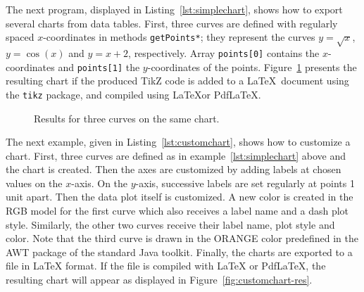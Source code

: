 \begin{latexonly}




The next program, displayed in Listing~\ref{lst:simplechart},
shows how to export several charts from data tables.
First, three curves are defined with regularly spaced $x$-coordinates
in methods \texttt{getPoints*}; they represent the curves $y = \sqrt x$,
$y = \cos(x)$ and $y = x+2$, respectively. Array \texttt{points[0]} contains
the $x$-coordinates and \texttt{points[1]} the $y$-coordinates
of the points.
Figure~\ref{fig:simplechart-res} presents the resulting chart if the produced
TikZ code is added to a \LaTeX\ document using the \texttt{tikz}
package, and compiled using \LaTeX  or PdfLaTeX.





\begin{figure}

\caption{Results for three curves on the same chart.\label{fig:simplechart-res}}
\end{figure}




The next example, given in Listing~\ref{lst:customchart},
 shows how to customize a chart. First, three curves are defined as
in example~\ref{lst:simplechart} above and the chart is created. Then the
axes are customized by adding labels at chosen values on the $x$-axis.
On the $y$-axis, successive labels are set regularly at points 1 unit apart.
Then the data plot itself is customized. A new color is created in the RGB
model for the first curve which also receives a label name and a dash plot style.
Similarly, the other two curves receive their label name, plot style
 and color. Note that the third curve is drawn in the ORANGE color predefined
 in the AWT package of the standard Java toolkit.
Finally, the charts are exported to a file in \LaTeX{}
format. If the file is compiled with \LaTeX{} or PdfLaTeX, the
resulting chart will appear as  displayed in Figure~\ref{fig:customchart-res}.






\end{latexonly}

